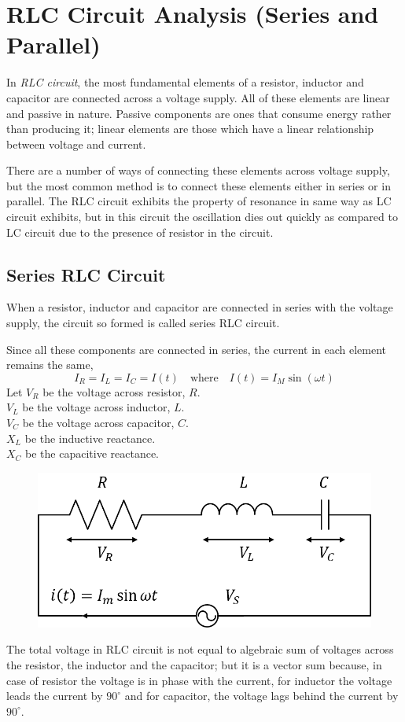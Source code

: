 \documentclass[../main.tex]{subfiles}
\begin{document}
\chapter{RLC Circuit Analysis (Series and Parallel)}
In \emph{RLC circuit}, the most fundamental elements of a resistor, inductor and capacitor are connected across a voltage supply. All of these elements are linear and passive in nature. Passive components are ones that consume energy rather than producing it; linear elements are those which have a linear relationship between voltage and current.

There are a number of ways of connecting these elements across voltage supply, but the most common method is to connect these elements either in series or in parallel. The RLC circuit exhibits the property of resonance in same way as LC circuit exhibits, but in this circuit the oscillation dies out quickly as compared to LC circuit due to the presence of resistor in the circuit.

\section{Series RLC Circuit}

When a resistor, inductor and capacitor are connected in series with the voltage supply, the circuit so formed is called series RLC circuit.

Since all these components are connected in series, the current in each element remains the same,
\[
    I_R=I_L=I_C=I(t)\quad\text{where}\quad I(t)=I_M\sin(\omega t)
\]
Let $ V_R $ be the voltage across resistor, $ R $.\\
\indent$ V_L $  be the voltage across inductor, $ L $.\\
\indent$ V_C $ be the voltage across capacitor, $ C $.\\
\indent$ X_L $ be the inductive reactance.\\
\indent$ X_C $ be the capacitive reactance.
\begin{figure}[ht]
    \centering
    \includegraphics[scale=1]{circuit-1.png}
\end{figure}
The total voltage in RLC circuit is not equal to algebraic sum of voltages across the resistor, the inductor and the capacitor; but it is a vector sum because, in case of resistor the voltage is in phase with the current, for inductor the voltage leads the current by $ 90^\circ $ and for capacitor, the voltage lags behind the current by $ 90^\circ $.
\end{document}
